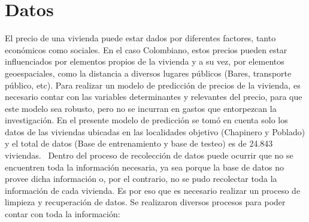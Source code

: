 \documentclass[conference, 10pt]{IEEEtran}
\begin{document}
\section{Datos} \label{AA}

El precio de una vivienda puede estar dados por diferentes factores, tanto económicos como sociales. En el caso Colombiano, estos precios pueden estar influenciados por elementos propios de la vivienda y a su vez, por elementos geoespaciales, como la distancia a diversos lugares públicos (Bares, transporte público, etc). Para realizar un modelo de predicción de precios de la vivienda, es necesario contar con las variables determinantes y relevantes del precio, para que este modelo sea robusto, pero no se incurran en gastos que entorpezcan la investigación. En el presente modelo de predicción se tomó en cuenta solo los datos de  las viviendas ubicadas en las localidades objetivo (Chapinero y Poblado) y el total de datos (Base de entrenamiento y base de testeo) es de 24.843 viviendas. \
Dentro del proceso de recolección de datos puede ocurrir que no se encuentren toda la información necesaria, ya sea porque la base de datos no provee dicha información o, por el contrario, no se pudo recolectar toda la información de cada vivienda. Es por eso que es necesario realizar un proceso de limpieza y recuperación de datos. Se realizaron diversos procesos para poder contar con toda la información:
\end{document}

